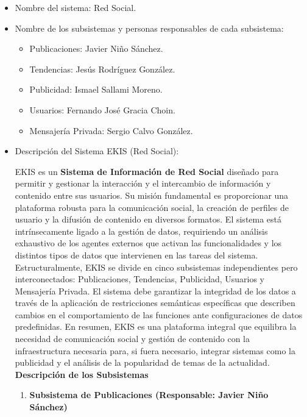 \documentclass[twoside,openright,titlepage,numbers=noenddot,headinclude,footinclude=true,
cleardoublepage=empty,abstractoff,BCOR=5mm,paper=a4,fontsize=12pt,main=spanish,pdfstartpage=1]{scrreprt}
\theoremstyle{plain}
\begin{document}
\begin{itemize}
  \item Nombre del sistema: Red Social.
  \item Nombre de los subsistemas y personas responsables de cada subsistema:
    \begin{itemize}
      \item Publicaciones: Javier Niño Sánchez.
      \item Tendencias: Jesús Rodríguez González.
      \item Publicidad: Ismael Sallami Moreno.
      \item Usuarios: Fernando José Gracia Choin.
      \item Mensajería Privada: Sergio Calvo González.
    \end{itemize}

    \item Descripción del Sistema EKIS (Red Social): 

    EKIS es un \textbf{Sistema de Información de Red Social} diseñado para permitir y gestionar la interacción y el intercambio de información y contenido entre sus usuarios. Su misión fundamental es proporcionar una plataforma robusta para la comunicación social, la creación de perfiles de usuario y la difusión de contenido en diversos formatos. El sistema está intrínsecamente ligado a la gestión de datos, requiriendo un análisis exhaustivo de los agentes externos que activan las funcionalidades y los distintos tipos de datos que intervienen en las tareas del sistema. Estructuralmente, EKIS se divide en cinco subsistemas independientes pero interconectados: Publicaciones, Tendencias, Publicidad, Usuarios y Mensajería Privada. El sistema debe garantizar la integridad de los datos a través de la aplicación de restricciones semánticas específicas que describen cambios en el comportamiento de las funciones ante configuraciones de datos predefinidas. En resumen, EKIS es una plataforma integral que equilibra la necesidad de comunicación social y gestión de contenido con la infraestructura necesaria para, si fuera necesario, integrar sistemas como la publicidad y el análisis de la popularidad de temas de la actualidad. \\

    \textbf{Descripción de los Subsistemas}

    \begin{enumerate}
      \item \textbf{Subsistema de Publicaciones (Responsable: Javier Niño Sánchez)}


\end{enumerate}
\end{itemize}
\end{document}

